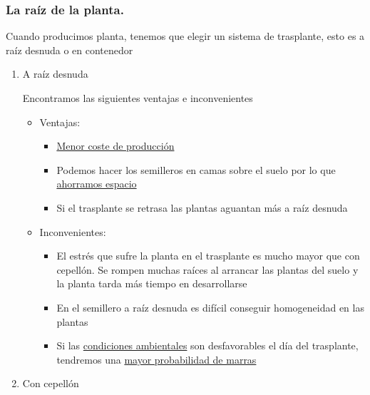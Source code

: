 \documentclass[a4paper,12pt,oneside]{article}
\begin{document}
\subsubsection{La raíz de la planta.}
\label{sec:org6257e77}
Cuando producimos planta, tenemos que elegir un sistema de trasplante, esto es
a raíz desnuda o en contenedor

\begin{enumerate}
\item A raíz desnuda
\label{sec:org8d37d2f}

Encontramos las siguientes ventajas e inconvenientes
\begin{itemize}
\item Ventajas:\\
\begin{itemize}
\item \uline{Menor coste de producción}
\item Podemos hacer los semilleros en camas sobre el suelo por lo que \uline{ahorramos
espacio}
\item Si el trasplante se retrasa las plantas aguantan más a raíz desnuda
\end{itemize}
\item Inconvenientes:\\
\begin{itemize}
\item El estrés que sufre la planta en el trasplante es mucho mayor que con
cepellón. Se rompen muchas raíces al arrancar las plantas del suelo y la
planta tarda más tiempo en desarrollarse
\item En el semillero a raíz desnuda es difícil conseguir homogeneidad en las plantas
\item Si las \uline{condiciones ambientales} son desfavorables el día del trasplante,
tendremos una \uline{mayor probabilidad de marras}
\end{itemize}
\end{itemize}

\item Con cepellón
\label{sec:org1cd8748}


\end{enumerate}
\end{document}
